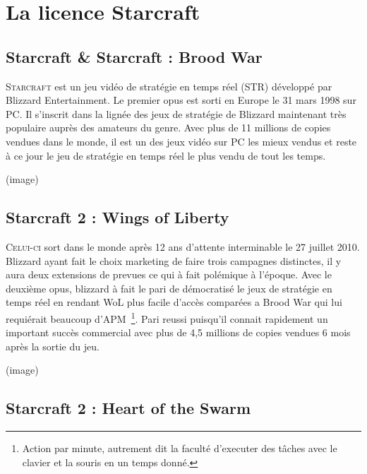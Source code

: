 \section{La licence Starcraft}%
\label{sec:la_licence_starcraft}

\subsection{Starcraft \& Starcraft : Brood War}%
\label{sub:starcraft_&_starcraft_brood_war}

\lettrine{S}{tarcraft} est un jeu vidéo de stratégie en temps réel (STR) développé
par Blizzard Entertainment. Le premier opus est sorti en Europe le 31
mars 1998 sur PC. Il s'inscrit dans la lignée des jeux de stratégie de
Blizzard maintenant très populaire auprès des amateurs du genre. Avec
plus de 11 millions de copies vendues dans le monde, il est un des
jeux vidéo sur PC les mieux vendus et reste à ce jour le jeu de
stratégie en temps réel le plus vendu de tout les temps.

(image)

\subsection{Starcraft 2 : Wings of Liberty}%
\label{sub:starcraft_2_wings_of_liberty}

\lettrine{C}{elui-ci} sort dans le monde après 12 ans d'attente
interminable le 27 juillet 2010. Blizzard ayant fait le choix marketing
de faire trois campagnes distinctes, il y aura deux extensions de
prevues ce qui à fait polémique à l'époque. Avec le deuxième opus,
blizzard à fait le pari de démocratisé le jeux de stratégie en temps
réel en rendant WoL plus facile d'accès comparées a Brood War qui lui
requiérait beaucoup d'APM\, \footnote{Action par minute, autrement dit
la faculté d'executer des tâches avec le clavier et la souris en un
temps donné.}. Pari reussi puisqu'il connait
rapidement un important succès commercial avec plus de 4,5 millions de
copies vendues 6 mois après la sortie du jeu.

(image)

\subsection{Starcraft 2 : Heart of the Swarm}%
\label{sub:starcraft_2_heart_of_the_swarm}

